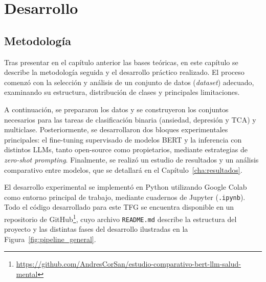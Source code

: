 %
%
%
% 
%
%
%
%

\chapter{Desarrollo}
\label{cha:desarrollo}

\section{Metodología}
\label{sec:introduccion-desarrollo}

Tras presentar en el capítulo anterior las bases teóricas, en este capítulo se describe la metodología seguida y el desarrollo práctico realizado. El proceso comenzó con la selección y análisis de un conjunto de datos (\textit{dataset}) adecuado, examinando su estructura, distribución de clases y principales limitaciones.

A continuación, se prepararon los datos y se construyeron los conjuntos necesarios para las tareas de clasificación binaria (ansiedad, depresión y \ac{TCA}) y multiclase. Posteriormente, se desarrollaron dos bloques experimentales principales: el fine-tuning supervisado de modelos \ac{BERT} y la inferencia con distintos \acp{LLM}, tanto open-source como propietarios, mediante estrategias de \textit{zero-shot prompting}. Finalmente, se realizó un estudio de resultados y un análisis comparativo entre modelos, que se detallará en el Capítulo~\ref{cha:resultados}.

El desarrollo experimental se implementó en Python utilizando Google Colab como entorno principal de trabajo, mediante cuadernos de Jupyter (\texttt{.ipynb}). Todo el código desarrollado para este TFG se encuentra disponible en un repositorio de GitHub\footnote{\url{https://github.com/AndresCorSan/estudio-comparativo-bert-llm-salud-mental}}, cuyo archivo \texttt{README.md} describe la estructura del proyecto y las distintas fases del desarrollo ilustradas en la Figura~\ref{fig:pipeline_general}.

